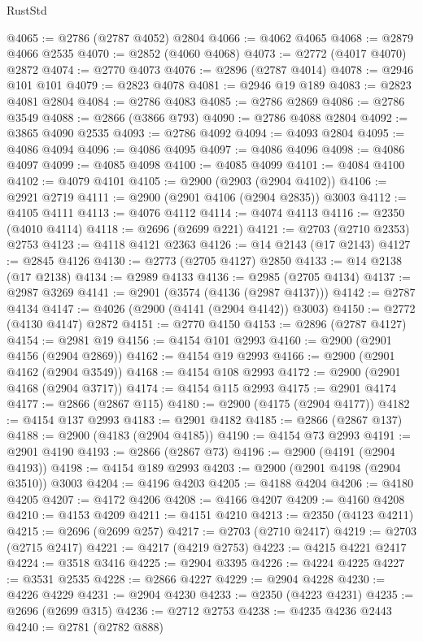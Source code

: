 \begin{lexlean}{RustStd}
\begin{coremodule}
@4065 := @2786 (@2787 @4052) @2804
@4066 := @4062 @4065
@4068 := @2879 @4066 @2535
@4070 := @2852 (@4060 @4068)
@4073 := @2772 (@4017 @4070) @2872
@4074 := @2770 @4073
@4076 := @2896 (@2787 @4014)
@4078 := @2946 @101 @101
@4079 := @2823 @4078
@4081 := @2946 @19 @189
@4083 := @2823 @4081 @2804
@4084 := @2786 @4083
@4085 := @2786 @2869
@4086 := @2786 @3549
@4088 := @2866 (@3866 @793)
@4090 := @2786 @4088 @2804
@4092 := @3865 @4090 @2535
@4093 := @2786 @4092
@4094 := @4093 @2804
@4095 := @4086 @4094
@4096 := @4086 @4095
@4097 := @4086 @4096
@4098 := @4086 @4097
@4099 := @4085 @4098
@4100 := @4085 @4099
@4101 := @4084 @4100
@4102 := @4079 @4101
@4105 := @2900 (@2903 (@2904 @4102))
@4106 := @2921 @2719
@4111 := @2900 (@2901 @4106 (@2904 @2835)) @3003
@4112 := @4105 @4111
@4113 := @4076 @4112
@4114 := @4074 @4113
@4116 := @2350 (@4010 @4114)
@4118 := @2696 (@2699 @221)
@4121 := @2703 (@2710 @2353) @2753
@4123 := @4118 @4121 @2363
@4126 := @14 @2143 (@17 @2143)
@4127 := @2845 @4126
@4130 := @2773 (@2705 @4127) @2850
@4133 := @14 @2138 (@17 @2138)
@4134 := @2989 @4133
@4136 := @2985 (@2705 @4134)
@4137 := @2987 @3269
@4141 := @2901 (@3574 (@4136 (@2987 @4137)))
@4142 := @2787 @4134
@4147 := @4026 (@2900 (@4141 (@2904 @4142)) @3003)
@4150 := @2772 (@4130 @4147) @2872
@4151 := @2770 @4150
@4153 := @2896 (@2787 @4127)
@4154 := @2981 @19
@4156 := @4154 @101 @2993
@4160 := @2900 (@2901 @4156 (@2904 @2869))
@4162 := @4154 @19 @2993
@4166 := @2900 (@2901 @4162 (@2904 @3549))
@4168 := @4154 @108 @2993
@4172 := @2900 (@2901 @4168 (@2904 @3717))
@4174 := @4154 @115 @2993
@4175 := @2901 @4174
@4177 := @2866 (@2867 @115)
@4180 := @2900 (@4175 (@2904 @4177))
@4182 := @4154 @137 @2993
@4183 := @2901 @4182
@4185 := @2866 (@2867 @137)
@4188 := @2900 (@4183 (@2904 @4185))
@4190 := @4154 @73 @2993
@4191 := @2901 @4190
@4193 := @2866 (@2867 @73)
@4196 := @2900 (@4191 (@2904 @4193))
@4198 := @4154 @189 @2993
@4203 := @2900 (@2901 @4198 (@2904 @3510)) @3003
@4204 := @4196 @4203
@4205 := @4188 @4204
@4206 := @4180 @4205
@4207 := @4172 @4206
@4208 := @4166 @4207
@4209 := @4160 @4208
@4210 := @4153 @4209
@4211 := @4151 @4210
@4213 := @2350 (@4123 @4211)
@4215 := @2696 (@2699 @257)
@4217 := @2703 (@2710 @2417)
@4219 := @2703 (@2715 @2417)
@4221 := @4217 (@4219 @2753)
@4223 := @4215 @4221 @2417
@4224 := @3518 @3416
@4225 := @2904 @3395
@4226 := @4224 @4225
@4227 := @3531 @2535
@4228 := @2866 @4227
@4229 := @2904 @4228
@4230 := @4226 @4229
@4231 := @2904 @4230
@4233 := @2350 (@4223 @4231)
@4235 := @2696 (@2699 @315)
@4236 := @2712 @2753
@4238 := @4235 @4236 @2443
@4240 := @2781 (@2782 @888)

\end{coremodule}
\end{lexlean}
